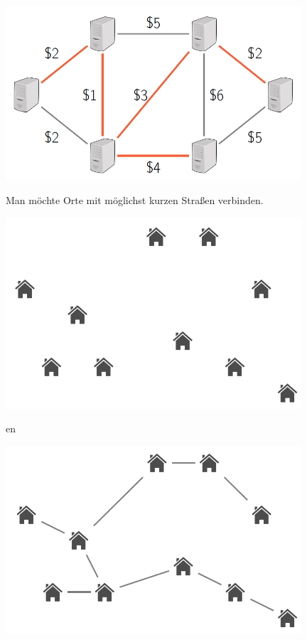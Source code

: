 \begin{frame}[fragile]

\includegraphics[width=11cm]{bild48.png}

\end{frame}

\begin{frame}[fragile]
Man möchte Orte mit möglichst kurzen Straßen verbinden.

\includegraphics[width=11cm]{bild49.png}

en
\end{frame}

\begin{frame}[fragile]
\includegraphics[width=11cm]{bild50.png}
\end{frame}

